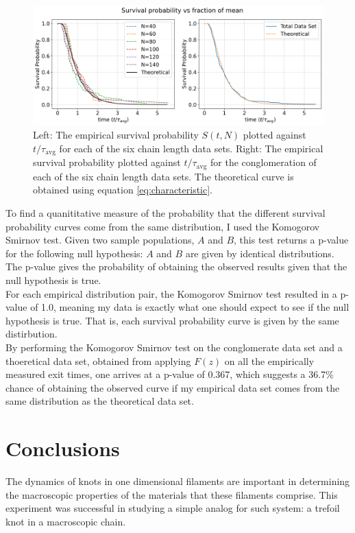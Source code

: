 \documentclass[11pt]{article}
\begin{document}
        \begin{figure}[h]
            \centering
            \includegraphics[scale=0.5]{survival.png}
            \caption{Left: The empirical survival probability $S(t,N)$ plotted against
            $t/\tau_\text{avg}$ for each of the six chain length data sets. Right: The empirical
            survival probability plotted against $t/\tau_\text{avg}$ for the conglomeration of each 
            of the six chain length data sets. The theoretical curve is obtained using equation \ref{eq:characteristic}.}
            \label{fig:survival}
        \end{figure}
    
    To find a quanititative measure of the probability that the different survival probability curves 
    come from the same distribution, I used the Komogorov Smirnov test. Given two sample populations, 
    $A$ and $B$, this test returns a p-value for the following null hypothesis: $A$ and $B$ are given by 
    identical distributions. The p-value gives the probability of obtaining the observed results given 
    that the null hypothesis is true.\\

    For each empirical distribution pair, the Komogorov Smirnov test resulted in a p-value of 1.0,
    meaning my data is exactly what one should expect to see if the null hypothesis is true. 
    That is, each survival probability curve is given by the same distirbution.\\

    By performing the Komogorov Smirnov test on the conglomerate data set and a thoeretical data set, 
    obtained from applying $F(z)$ on all the empirically measured exit times, one arrives at a p-value 
    of 0.367, which suggests a 36.7\% chance of obtaining the observed curve if my empirical data set 
    comes from the same distribution as the theoretical data set. 
\section{Conclusions}
    The dynamics of knots in one dimensional filaments are important in determining the macroscopic
    properties of the materials that these filaments comprise. This experiment was successful in 
    studying a simple analog for such system: a trefoil knot in a macroscopic chain.\\
\end{document}
